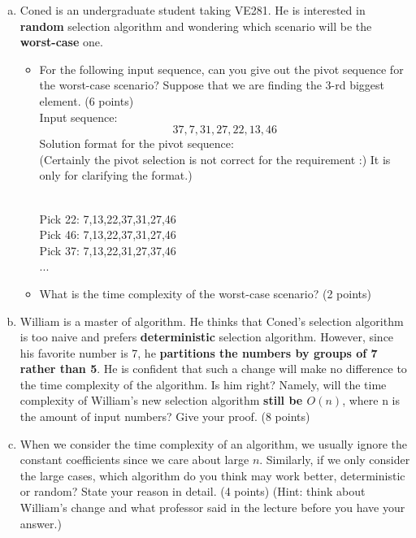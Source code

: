 \documentclass[11pt]{exam}
\begin{document}
\begin{enumerate}[(a)]
\item Coned is an undergraduate student taking VE281. He is interested in \textbf{random} selection algorithm and wondering which scenario will be the \textbf{worst-case} one.
\begin{itemize}
    \item For the following input sequence, can you give out the pivot sequence for the worst-case scenario? Suppose that we are finding the 3-rd biggest element. (6 points)\\
    Input sequence:
    $$37,7,31,27,22,13,46$$
    Solution format for the pivot sequence:\\
    (Certainly the pivot selection is not correct for the requirement :) It is only for clarifying the format.)
    \begin{solution}
    \\
    Pick 22: 7,13,22,37,31,27,46\\
    Pick 46: 7,13,22,37,31,27,46\\
    Pick 37: 7,13,22,31,27,37,46\\
    ...
    \end{solution}
\item What is the time complexity of the worst-case scenario? (2 points)
\end{itemize}
\item William is a master of algorithm. He thinks that Coned's selection algorithm is too naive and prefers \textbf{deterministic} selection algorithm. However, since his favorite number is 7, he \textbf{partitions the numbers by groups of 7 rather than 5}. He is confident that such a change will make no difference to the time complexity of the algorithm. Is him right? Namely, will the time complexity of William's new selection algorithm \textbf{still be $O(n)$}, where n is the amount of input numbers? Give your proof. (8 points)
\item When we consider the time complexity of an algorithm, we usually ignore the constant coefficients since we care about large $n$. Similarly, if we only consider the large cases, which algorithm do you think may work better, deterministic or random? State your reason in detail. (4 points) (Hint: think about William's change and what professor said in the lecture before you have your answer.)
\end{enumerate}

\begin{solution}
\end{solution}
\end{document}
